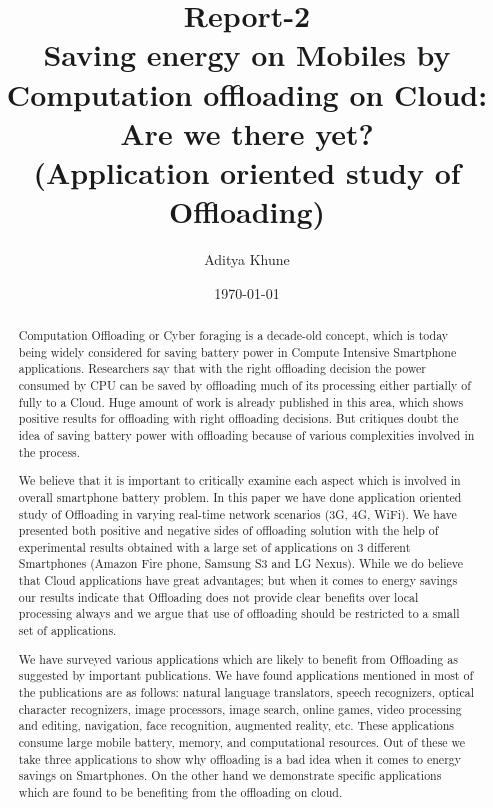 \documentclass[12pt]{report}
\begin{document}
\title{Report-2\\
Saving energy on Mobiles by Computation offloading on Cloud: Are we there yet? \\
(Application oriented study of Offloading)}

\author{Aditya Khune}

\date{\today}  %
\maketitle
\tableofcontents



\begin{abstract}
Computation Offloading or Cyber foraging is a decade-old concept, which is today being widely considered for saving battery power in Compute Intensive Smartphone applications. Researchers say that with the right offloading decision the power consumed by CPU can be saved by offloading much of its processing either partially of fully to a Cloud. Huge amount of work is already published in this area, which shows positive results for offloading with right offloading decisions. But critiques doubt the idea of saving battery power with offloading because of various complexities involved in the process.

We believe that it is important to critically examine each aspect which is involved in overall smartphone battery problem. In this paper we have done application oriented study of Offloading in varying real-time network scenarios (3G, 4G, WiFi). We have presented both positive and negative sides of offloading solution with the help of experimental results obtained with a large set of applications on 3 different Smartphones (Amazon Fire phone, Samsung S3 and LG Nexus). While we do believe that Cloud applications have great advantages; but when it comes to energy savings our results indicate that Offloading does not provide clear benefits over local processing always and we argue that use of offloading should be restricted to a small set of applications.

We have surveyed various applications which are likely to benefit from Offloading as suggested by important publications. We have found applications mentioned in most of the publications are as follows: natural language translators, speech recognizers, optical character recognizers, image processors, image search, online games, video processing and editing, navigation, face recognition, augmented reality, etc. These applications consume large mobile battery, memory, and computational resources.
Out of these we take three applications to show why offloading is a bad idea when it comes to energy savings on Smartphones. On the other hand we demonstrate specific applications which are found to be benefiting from the offloading on cloud.
\end{abstract}
\end{document}
